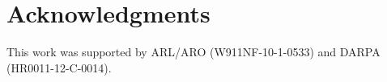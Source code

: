 \section*{Acknowledgments}
This work was supported by ARL/ARO (W911NF-10-1-0533) and DARPA (HR0011-12-C-0014).
